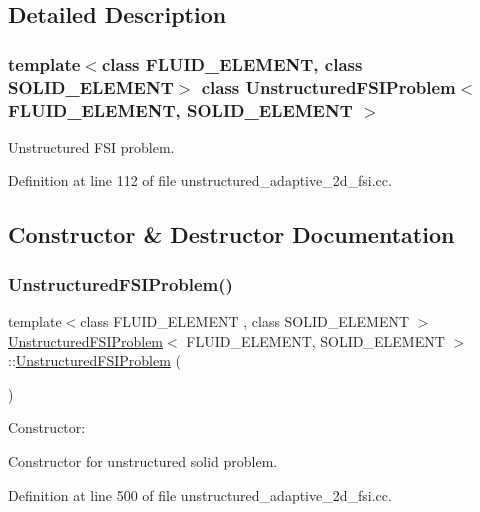 \subsection{Detailed Description}
\subsubsection*{template$<$class F\+L\+U\+I\+D\+\_\+\+E\+L\+E\+M\+E\+NT, class S\+O\+L\+I\+D\+\_\+\+E\+L\+E\+M\+E\+NT$>$\newline
class Unstructured\+F\+S\+I\+Problem$<$ F\+L\+U\+I\+D\+\_\+\+E\+L\+E\+M\+E\+N\+T, S\+O\+L\+I\+D\+\_\+\+E\+L\+E\+M\+E\+N\+T $>$}

Unstructured F\+SI problem. 

Definition at line 112 of file unstructured\+\_\+adaptive\+\_\+2d\+\_\+fsi.\+cc.



\subsection{Constructor \& Destructor Documentation}
\mbox{\label{classUnstructuredFSIProblem_a6a31fd839e0215ef1312942cf7284bd2}} 
\subsubsection{\texorpdfstring{Unstructured\+F\+S\+I\+Problem()}{UnstructuredFSIProblem()}}
{\footnotesize\ttfamily template$<$class F\+L\+U\+I\+D\+\_\+\+E\+L\+E\+M\+E\+NT , class S\+O\+L\+I\+D\+\_\+\+E\+L\+E\+M\+E\+NT $>$ \\
\hyperlink{classUnstructuredFSIProblem}{Unstructured\+F\+S\+I\+Problem}$<$ F\+L\+U\+I\+D\+\_\+\+E\+L\+E\+M\+E\+NT, S\+O\+L\+I\+D\+\_\+\+E\+L\+E\+M\+E\+NT $>$\+::\hyperlink{classUnstructuredFSIProblem}{Unstructured\+F\+S\+I\+Problem} (\begin{DoxyParamCaption}{ }\end{DoxyParamCaption})}



Constructor\+: 

Constructor for unstructured solid problem. 

Definition at line 500 of file unstructured\+\_\+adaptive\+\_\+2d\+\_\+fsi.\+cc.



